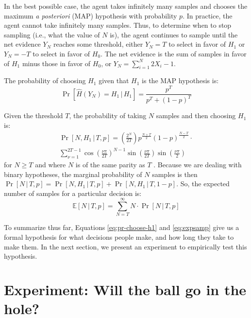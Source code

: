 \documentclass[10pt,letterpaper]{article}
\begin{document}
In the best possible case, the agent takes infinitely many samples and chooses the maximum \emph{a posteriori} (MAP) hypothesis with probability $p$. 
In practice, the agent cannot take infinitely many samples. 
Thus, to determine when to stop sampling (i.e., what the value of $N$ is), the agent continues to sample until the net evidence $Y_N$ reaches some threshold, either $Y_N=T$ to select in favor of $H_1$ or $Y_N=-T$ to select in favor of $H_0$. 
The net evidence is the sum of samples in favor of $H_1$ minus those in favor of $H_0$, or $Y_N=\sum_{i=1}^N 2X_i-1$.

The probability of choosing $H_1$ given that $H_1$ is the MAP hypothesis is:
\begin{equation}
\Pr[\hat{H}(Y_N)=H_1\,|\,H_1]=\frac{p^T}{p^T+(1-p)^T}
\label{eq:pr-choose-h1}
\end{equation}

Given the threshold $T$, the probability of taking $N$ samples and then choosing $H_1$ is:
\begin{multline}
\Pr[N,H_1\,|\,T,p]=\left(\frac{2^N}{2T}\right)p^{\frac{N+T}{2}}(1-p)^{\frac{N-T}{2}}\cdot{}\\
\sum_{\nu=1}^{2T-1}\cos\left(\frac{\nu\pi}{2T}\right)^{N-1}\sin\left(\frac{\nu\pi}{2T}\right)\sin\left(\frac{\nu\pi}{2}\right)
\end{multline}
for $N\geq T$ and where $N$ is of the same parity as $T$ \cite[ch.~XIV, eq. 5.7]{Feller:1968ut}. 
Because we are dealing with binary hypotheses, the marginal probability of $N$ samples is then $\Pr[N\,|\,T,p]=\Pr[N,H_1\,|\,T,p]+\Pr[N,H_1\,|\,T,1-p]$.
So, the expected number of samples for a particular decision is:
\begin{equation}
\mathbb{E}[N\,|\,T,p]=\sum_{N=T}^\infty N\cdot{}\Pr[N\,|\,T,p]
\label{eq:expsamp}
\end{equation}

To summarize thus far, Equations \ref{eq:pr-choose-h1} and \ref{eq:expsamp} give us a formal hypothesis for what decisions people make, and how long they take to make them. 
In the next section, we present an experiment to empirically test this hypothesis.

\section{Experiment: Will the ball go in the hole?}
\end{document}
